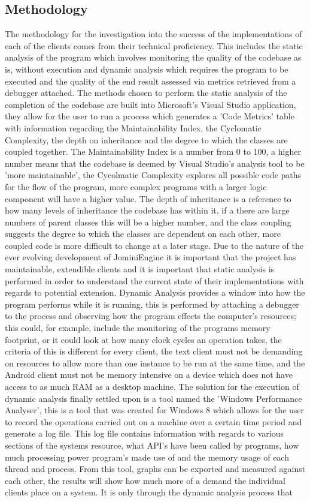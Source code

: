 \documentclass{article}
\begin{document}
\subsection{Methodology}
The methodology for the investigation into the success of the implementations of each of the clients comes from their technical proficiency. This includes the static analysis of the program which involves monitoring the quality of the codebase as is, without execution and dynamic analysis which requires the program to be executed and the quality of the end result assessed via metrics retrieved from a debugger attached. The methods chosen  to perform the static analysis of the completion of the codebase are built into Microsoft's Visual Studio application, they allow for the user to run a process which generates a 'Code Metrics' table with information regarding the Maintainability Index, the Cyclomatic Complexity, the depth on inheritance and the degree to which the classes are coupled together. The Maintainability Index is a number from 0 to 100, a higher number means that the codebase is deemed by Visual Studio's analysis tool to be 'more maintainable', the Cycolmatic Complexity explores all possible code paths for the flow of the program, more complex programs with a larger logic component will have a higher value. The depth of inheritance is a reference to how many levels of inheritance the codebase has within it, if a there are large numbers of parent classes this will be a higher number, and the class coupling suggests the degree to which the classes are dependent on each other, more coupled code is more difficult to change at a later stage. Due to the nature of the ever evolving development of JominiEngine it is important that the project has maintainable, extendible clients and it is important that static analysis is performed in order to understand the current state of their implementations with regards to potential extension. Dynamic Analysis provides a window into how the program performs while it is running, this is performed by attaching a debugger to the process and observing how the program effects the computer's resources; this could, for example, include the monitoring of the programs memory footprint, or it could look at how many clock cycles an operation takes, the criteria of this is different for every client, the text client must not be demanding on resources to allow more than one instance to be run at the same time, and the Android client must not be memory intensive on a device which does not have access to as much RAM as a desktop machine. The solution for the execution of dynamic analysis finally settled upon is a tool named the 'Windows Performance Analyser', this is a tool that was created for Windows 8 which allows for the user to record the operations carried out on a machine over a certain time period and generate a log file. This log file contains information with regards to various sections of the systems resource, what API's have been called by programs, how much processing power program's made use of and the memory usage of each thread and process. From this tool, graphs can be exported and measured against each other, the results will show how much more of a demand the individual clients place on a system. It is only through the dynamic analysis process that 
\end{document}
